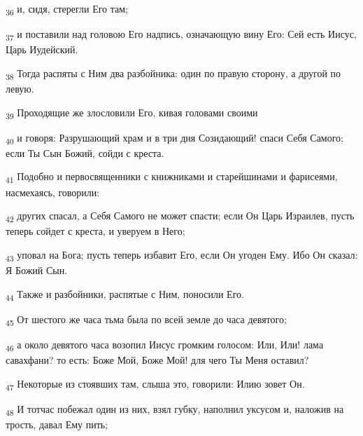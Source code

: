 \begin{tcolorbox}
\textsubscript{36} и, сидя, стерегли Его там;
\end{tcolorbox}
\begin{tcolorbox}
\textsubscript{37} и поставили над головою Его надпись, означающую вину Его: Сей есть Иисус, Царь Иудейский.
\end{tcolorbox}
\begin{tcolorbox}
\textsubscript{38} Тогда распяты с Ним два разбойника: один по правую сторону, а другой по левую.
\end{tcolorbox}
\begin{tcolorbox}
\textsubscript{39} Проходящие же злословили Его, кивая головами своими
\end{tcolorbox}
\begin{tcolorbox}
\textsubscript{40} и говоря: Разрушающий храм и в три дня Созидающий! спаси Себя Самого; если Ты Сын Божий, сойди с креста.
\end{tcolorbox}
\begin{tcolorbox}
\textsubscript{41} Подобно и первосвященники с книжниками и старейшинами и фарисеями, насмехаясь, говорили:
\end{tcolorbox}
\begin{tcolorbox}
\textsubscript{42} других спасал, а Себя Самого не может спасти; если Он Царь Израилев, пусть теперь сойдет с креста, и уверуем в Него;
\end{tcolorbox}
\begin{tcolorbox}
\textsubscript{43} уповал на Бога; пусть теперь избавит Его, если Он угоден Ему. Ибо Он сказал: Я Божий Сын.
\end{tcolorbox}
\begin{tcolorbox}
\textsubscript{44} Также и разбойники, распятые с Ним, поносили Его.
\end{tcolorbox}
\begin{tcolorbox}
\textsubscript{45} От шестого же часа тьма была по всей земле до часа девятого;
\end{tcolorbox}
\begin{tcolorbox}
\textsubscript{46} а около девятого часа возопил Иисус громким голосом: Или, Или! лама савахфани? то есть: Боже Мой, Боже Мой! для чего Ты Меня оставил?
\end{tcolorbox}
\begin{tcolorbox}
\textsubscript{47} Некоторые из стоявших там, слыша это, говорили: Илию зовет Он.
\end{tcolorbox}
\begin{tcolorbox}
\textsubscript{48} И тотчас побежал один из них, взял губку, наполнил уксусом и, наложив на трость, давал Ему пить;
\end{tcolorbox}
